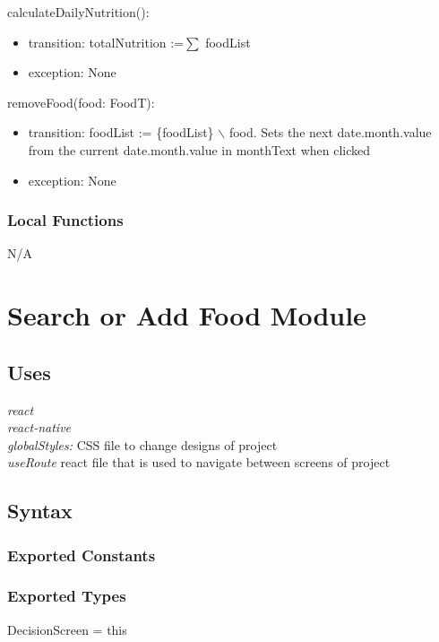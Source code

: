 \documentclass[12pt, titlepage]{article}
\begin{document}
\noindent calculateDailyNutrition():
\begin{itemize}
	\item transition: totalNutrition :=$ \sum $ foodList
	\item exception: None 
\end{itemize}

\noindent removeFood(food: FoodT):
\begin{itemize}
	\item transition: foodList := \{foodList\} $\backslash$ food. Sets the next date.month.value from the current date.month.value in monthText when clicked
	\item exception: None 
\end{itemize}

\subsubsection{Local Functions}

N/A

\section{Search or Add Food Module} \label{Module} 

\subsection{Uses}
{\textit{react}}\\
{\textit{react-native}}\\
{\textit{globalStyles:} CSS file to change designs of project}\\
{\textit{useRoute} react file that is used to navigate between screens of project}\\

\subsection{Syntax}

\subsubsection{Exported Constants}

\subsubsection{Exported Types}
DecisionScreen = this
\end{document}
